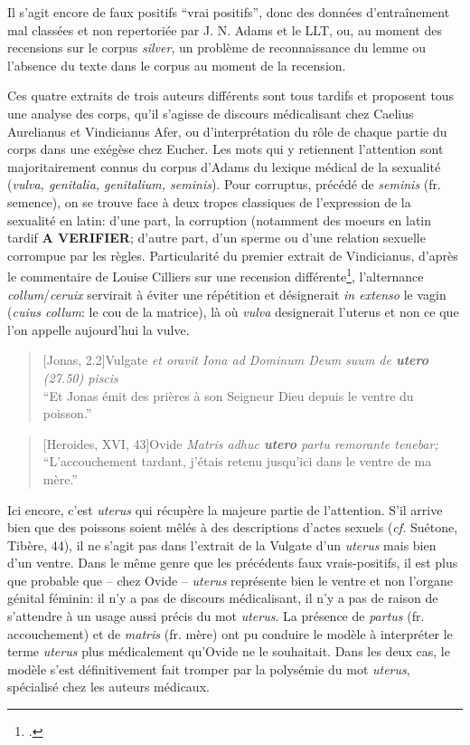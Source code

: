 Il s'agit encore de faux positifs ``vrai positifs'', donc des données d'entraînement mal classées et non repertoriée par J. N. Adams et le LLT, ou, au moment des recensions sur le corpus \textit{silver}, un problème de reconnaissance du lemme ou l'absence du texte dans le corpus au moment de la recension. 

Ces quatre extraits de trois auteurs différents sont tous tardifs et proposent tous une analyse des corps, qu'il s'agisse de discours médicalisant chez Caelius Aurelianus et Vindicianus Afer, ou d'interprétation du rôle de chaque partie du corps dans une exégèse chez Eucher. Les mots qui y retiennent l'attention sont majoritairement connus du corpus d'Adams du lexique médical de la sexualité (\textit{vulva, genitalia, genitalium, seminis}). Pour {corruptus}, précédé de \textit{seminis} (fr. semence), on se trouve face à deux tropes classiques de l'expression de la sexualité en latin: d'une part, la corruption (notamment des moeurs en latin tardif \textbf{A VERIFIER}; d'autre part, d'un sperme ou d'une relation sexuelle corrompue par les règles. Particularité du premier extrait de Vindicianus, d'après le commentaire de Louise Cilliers sur une recension différente\footcite[p.236]{cilliers_vindicianuss_2005}, l'alternance \textit{collum}/\textit{ceruix} servirait à éviter une répétition et désignerait \textit{in extenso} le vagin (\textit{cuius collum}: le cou de la matrice), là où \textit{vulva} designerait l'uterus et non ce que l'on appelle aujourd'hui la vulve.

\begin{quote}[Jonas, 2.2]{Vulgate}
    \textit{et oravit Iona ad Dominum Deum suum de \textbf{utero} (27.50) piscis} \\
    \enquote{Et Jonas émit des prières à son Seigneur Dieu depuis le ventre du poisson.}
\end{quote}

\begin{quote}[Heroides, XVI, 43]{Ovide}
    \textit{Matris adhuc \textbf{utero} partu remorante tenebar;} \\
    \enquote{L'accouchement tardant, j'étais retenu jusqu'ici dans le ventre de ma mère.}
\end{quote} 

Ici encore, c'est \textit{uterus} qui récupère la majeure partie de l'attention. S'il arrive bien que des poissons soient mêlés à des descriptions d'actes sexuels (\textit{cf.} Suétone, Tibère, 44), il ne s'agit pas dans l'extrait de la Vulgate d'un \textit{uterus} mais bien d'un ventre. Dans le même genre que les précédents faux vrais-positifs, il est plus que probable que -- chez Ovide -- \textit{uterus} représente bien le ventre et non l'organe génital féminin: il n'y a pas de discours médicalisant, il n'y a pas de raison de s'attendre à un usage aussi précis du mot \textit{uterus}. La présence de \textit{partus} (fr. accouchement) et de \textit{matris} (fr. mère) ont pu conduire le modèle à interpréter le terme \textit{uterus} plus médicalement qu'Ovide ne le souhaitait. Dans les deux cas, le modèle s'est définitivement fait tromper par la polysémie du mot \textit{uterus}, spécialisé chez les auteurs médicaux.

